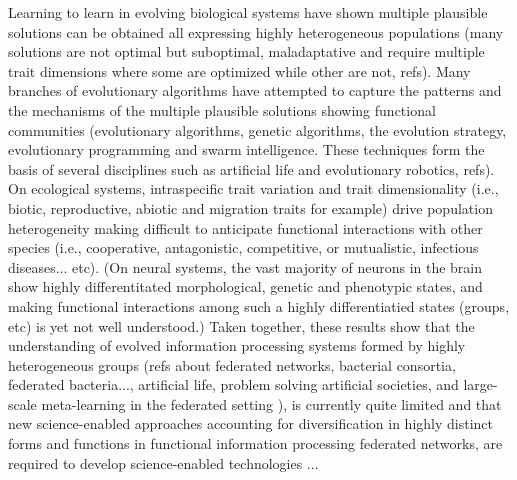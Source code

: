 \documentclass[11pt, a4paper]{article} %
\begin{document}
Learning to learn in evolving biological systems have shown multiple
plausible solutions can be obtained all expressing highly
heterogeneous populations (many solutions are not optimal but
suboptimal, maladaptative and require multiple trait dimensions where
some are optimized while other are not, refs). Many branches of
evolutionary algorithms have attempted to capture the patterns and the
mechanisms of the multiple plausible solutions showing functional
communities (evolutionary algorithms, genetic algorithms, the
evolution strategy, evolutionary programming and swarm
intelligence. These techniques form the basis of several disciplines
such as artificial life and evolutionary robotics, refs). On
ecological systems, intraspecific trait variation and trait
dimensionality (i.e., biotic, reproductive, abiotic and migration
traits for example) drive population heterogeneity making difficult to
anticipate functional interactions with other species (i.e.,
cooperative, antagonistic, competitive, or mutualistic, infectious
diseases... etc). (On neural systems, the vast majority of neurons in
the brain show highly differentitated morphological, genetic and
phenotypic states, and making functional interactions among such a
highly differentiatied states (groups, etc) is yet not well
understood.) Taken together, these results show that the understanding
of evolved information processing systems formed by highly
heterogeneous groups (refs about federated networks, bacterial
consortia, federated bacteria..., artificial life, problem solving
artificial societies, and large-scale meta-learning in the federated
setting \citep{Dilley2016}), is currently quite limited and that new
science-enabled approaches accounting for diversification in highly
distinct forms and functions in functional information processing
federated networks, are required to develop science-enabled
technologies ...
\end{document}
